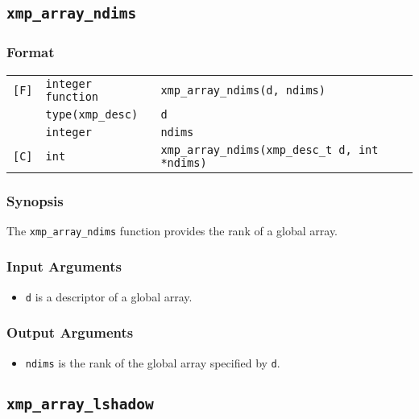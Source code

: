\subsection{\tt xmp\_array\_ndims}

\subsubsection*{Format}

\begin{tabular}{lll}

\verb![F]!& {\tt integer function}& {\tt xmp\_array\_ndims(d, ndims)}\\
          & {\tt type(xmp\_desc)} & {\tt d}\\
          & {\tt integer} & {\tt ndims}\\

\verb![C]!&  {\tt int}& {\tt xmp\_array\_ndims(xmp\_desc\_t d, int *ndims)}\\

\end{tabular}

\subsubsection*{Synopsis}

The {\tt xmp\_array\_ndims} function provides the rank of a global
array.


\subsubsection*{Input Arguments}
\begin{itemize}
 \item {\tt d} is a descriptor of a global array.
\end{itemize}

\subsubsection*{Output Arguments}
\begin{itemize}
 \item {\tt ndims} is the rank of the global array specified by {\tt d}.
\end{itemize}


\subsection{\tt xmp\_array\_lshadow}

